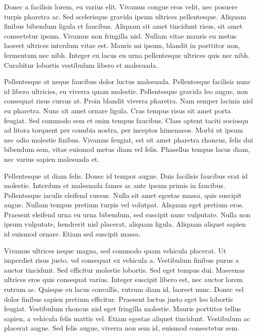 \documentclass[a4paper, 12pt, notitlepage]{report}
\begin{document}
    Donec a facilisis lorem, eu varius elit. Vivamus congue eros velit, nec posuere turpis pharetra ac. Sed scelerisque gravida ipsum ultrices pellentesque. Aliquam finibus bibendum ligula et faucibus. Aliquam sit amet tincidunt risus, sit amet consectetur ipsum. Vivamus non fringilla nisl. Nullam vitae mauris eu metus laoreet ultrices interdum vitae est. Mauris mi ipsum, blandit in porttitor non, fermentum nec nibh. Integer eu lacus eu urna pellentesque ultrices quis nec nibh. Curabitur lobortis vestibulum libero et malesuada.
    
    Pellentesque at neque faucibus dolor luctus malesuada. Pellentesque facilisis nunc id libero ultricies, eu viverra quam molestie. Pellentesque gravida leo augue, non consequat risus cursus at. Proin blandit viverra pharetra. Nam semper lacinia nisl eu pharetra. Nunc sit amet ornare ligula. Cras tempus risus sit amet porta feugiat. Sed commodo sem et enim tempus faucibus. Class aptent taciti sociosqu ad litora torquent per conubia nostra, per inceptos himenaeos. Morbi ut ipsum nec odio molestie finibus. Vivamus feugiat, est sit amet pharetra rhoncus, felis dui bibendum sem, vitae euismod metus diam vel felis. Phasellus tempus lacus diam, nec varius sapien malesuada et.
    
    Pellentesque at diam felis. Donec id tempor augue. Duis facilisis faucibus erat id molestie. Interdum et malesuada fames ac ante ipsum primis in faucibus. Pellentesque iaculis eleifend cursus. Nulla sit amet egestas massa, quis suscipit augue. Nullam tempus pretium turpis vel volutpat. Aliquam eget pretium eros. Praesent eleifend urna eu urna bibendum, sed suscipit nunc vulputate. Nulla non ipsum vulputate, hendrerit nisl placerat, aliquam ligula. Aliquam aliquet sapien id euismod ornare. Etiam sed suscipit massa.
    
    Vivamus ultrices neque magna, sed commodo quam vehicula placerat. Ut imperdiet risus justo, vel consequat ex vehicula a. Vestibulum finibus purus a auctor tincidunt. Sed efficitur molestie lobortis. Sed eget tempus dui. Maecenas ultrices eros quis consequat varius. Integer suscipit libero est, nec auctor lorem rutrum ac. Quisque eu lacus convallis, rutrum diam id, laoreet nunc. Donec vel dolor finibus sapien pretium efficitur. Praesent luctus justo eget leo lobortis feugiat. Vestibulum rhoncus nisl eget fringilla molestie. Mauris porttitor tellus sapien, a vehicula felis mattis vel. Etiam egestas aliquet tincidunt. Vestibulum ac placerat augue. Sed felis augue, viverra non sem id, euismod consectetur sem. 
\end{document}
